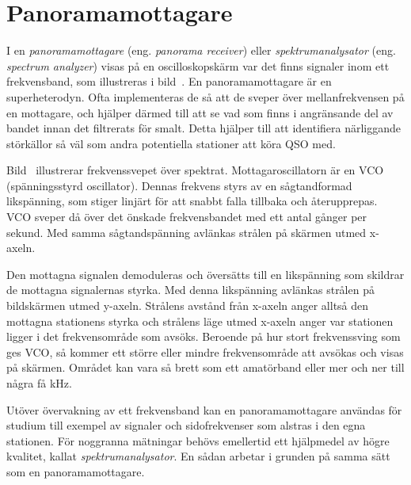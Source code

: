 \newpage
\section{Panoramamottagare}


I en \emph{panoramamottagare} (eng. \emph{panorama receiver}) eller
\emph{spektrumanalysator} (eng. \emph{spectrum analyzer}) visas på en
oscilloskopskärm var det finns signaler inom ett frekvensband, som illustreras
i bild~.
En panoramamottagare är en superheterodyn.
Ofta implementeras de så att de sveper över mellanfrekvensen på en mottagare,
och hjälper därmed till att se vad som finns i angränsande del av bandet innan
det filtrerats för smalt.
Detta hjälper till att identifiera närliggande störkällor så väl som andra
potentiella stationer att köra QSO med.


Bild~ illustrerar frekvenssvepet över spektrat.
Mottagaroscillatorn är en VCO (spänningsstyrd oscillator).
Dennas frekvens styrs av en sågtandformad likspänning, som stiger linjärt för
att snabbt falla tillbaka och återupprepas.
VCO sveper då över det önskade frekvensbandet med ett antal gånger per sekund.
Med samma sågtandspänning avlänkas strålen på skärmen utmed x-axeln.

Den mottagna signalen demoduleras och översätts till en likspänning
som skildrar de mottagna signalernas styrka.
Med denna likspänning avlänkas strålen på bildskärmen utmed y-axeln.
Strålens avstånd från x-axeln anger alltså den mottagna stationens styrka
och strålens läge utmed x-axeln anger var stationen ligger i det
frekvensområde som avsöks.
Beroende på hur stort frekvenssving som ges VCO, så kommer ett större eller
mindre frekvensområde att avsökas och visas på skärmen.
Området kan vara så brett som ett amatörband eller mer och ner till några
få \unit{\kilo\hertz}.

Utöver övervakning av ett frekvensband kan en panoramamottagare användas för
studium till exempel av signaler och sidofrekvenser som alstras i den egna
stationen.
För noggranna mätningar behövs emellertid ett hjälpmedel av högre kvalitet,
kallat \emph{spektrumanalysator}.
En sådan arbetar i grunden på samma sätt som en panoramamottagare.

